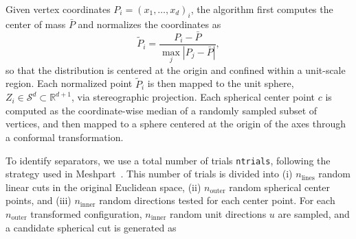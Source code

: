     Given vertex coordinates $P_i = (x_1, \dots, x_d)_i$, the algorithm first computes the center of mass $\bar{P}$ and normalizes the coordinates as
    \begin{equation}
        \tilde{P}_i=\frac{P_i-\bar{P}}{\max_j{|P_j-\bar{P}|}},
    \end{equation}
    so that the distribution is centered at the origin and confined within a unit-scale region.
    Each normalized point $\tilde{P}_i$ is then mapped to the unit sphere,
    $Z_i \in \mathcal{S}^d \subset{\mathbb{R}^{d+1}}$, via stereographic projection. Each spherical center point $c$ is computed as the coordinate-wise median
    of a randomly sampled subset of vertices, and then mapped to a
    sphere centered at the origin of the axes through
    a conformal transformation.

    To identify separators, we use a total number of trials \texttt{ntrials},
    following the strategy used in Meshpart~\cite{gilbert_2020_3746723}. This number of trials is divided into
    (i) $n_{\mathrm{lines}}$ random linear cuts in the original Euclidean space,
    (ii) $n_{\mathrm{outer}}$ random spherical center points, and 
    (iii) $n_{\mathrm{inner}}$ random directions tested for each center point.
% 
    For each $n_{\mathrm{outer}}$ transformed configuration, $n_{\mathrm{inner}}$ random unit directions $u$ are sampled, and a candidate spherical cut is generated as

